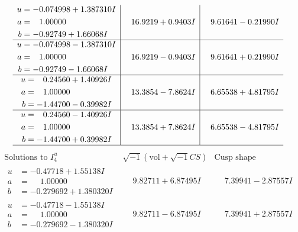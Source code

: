 \documentclass[1p]{elsarticle_modified}
\theoremstyle{definition}
\newcommand{\I}{\sqrt{-1}}
\begin{document}
$$\begin{array}{c|c|c}
\begin{aligned}
u &= -0.074998 + 1.387310 I \\
a &= \phantom{-}1.00000\phantom{ +0.000000I} \\
b &= -0.92749 + 1.66068 I\end{aligned}
 & \phantom{-}16.9219 + 0.9403 I & \phantom{-}9.61641 - 0.21990 I \\ \hline\begin{aligned}
u &= -0.074998 - 1.387310 I \\
a &= \phantom{-}1.00000\phantom{ +0.000000I} \\
b &= -0.92749 - 1.66068 I\end{aligned}
 & \phantom{-}16.9219 - 0.9403 I & \phantom{-}9.61641 + 0.21990 I \\ \hline\begin{aligned}
u &= \phantom{-}0.24560 + 1.40926 I \\
a &= \phantom{-}1.00000\phantom{ +0.000000I} \\
b &= -1.44700 - 0.39982 I\end{aligned}
 & \phantom{-}13.3854 - 7.8624 I & \phantom{-}6.65538 + 4.81795 I \\ \hline\begin{aligned}
u &= \phantom{-}0.24560 - 1.40926 I \\
a &= \phantom{-}1.00000\phantom{ +0.000000I} \\
b &= -1.44700 + 0.39982 I\end{aligned}
 & \phantom{-}13.3854 + 7.8624 I & \phantom{-}6.65538 - 4.81795 I\\
 \hline 
 \end{array}$$\newpage$$\begin{array}{c|c|c}  
\text{Solutions to }I^u_{4}& \I (\text{vol} + \sqrt{-1}CS) & \text{Cusp shape}\\
 \hline 
\begin{aligned}
u &= -0.47718 + 1.55138 I \\
a &= \phantom{-}1.00000\phantom{ +0.000000I} \\
b &= -0.279692 + 1.380320 I\end{aligned}
 & \phantom{-}9.82711 + 6.87495 I & \phantom{-}7.39941 - 2.87557 I \\ \hline\begin{aligned}
u &= -0.47718 - 1.55138 I \\
a &= \phantom{-}1.00000\phantom{ +0.000000I} \\
b &= -0.279692 - 1.380320 I\end{aligned}
 & \phantom{-}9.82711 - 6.87495 I & \phantom{-}7.39941 + 2.87557 I \\ \hline\begin{aligned}

\end{aligned}
\end{array}$$
\end{document}
